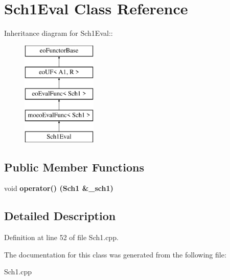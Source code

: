 \section{Sch1Eval Class Reference}
\label{classSch1Eval}
Inheritance diagram for Sch1Eval::\begin{figure}[H]
\begin{center}
\leavevmode
\includegraphics[height=5cm]{classSch1Eval}
\end{center}
\end{figure}
\subsection*{Public Member Functions}
\begin{CompactItemize}
\item 
void \bf{operator()} (\bf{Sch1} \&\_\-sch1)\label{classSch1Eval_4f806a964f7bafa9e4fcca45da458c98}

\end{CompactItemize}


\subsection{Detailed Description}




Definition at line 52 of file Sch1.cpp.

The documentation for this class was generated from the following file:\begin{CompactItemize}
\item 
Sch1.cpp\end{CompactItemize}
